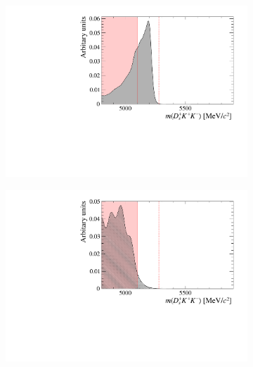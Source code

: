 \begin{figure}[!h]
    \centering
    \begin{subfigure}[t]{0.49\textwidth}
        \includegraphics[width=1.0\textwidth]{figs/B2DsKK/Bs2Dsa1_4800_5900_Shape.pdf}
        \caption{\decay{\Bsb}{\Dsp\Km\Kstarz} }
        \label{fig:B2DsKK_part_reco_backgrounds_DsKKstar}
    \end{subfigure}
    \begin{subfigure}[t]{0.49\textwidth}
        \includegraphics[width=1.0\textwidth]{figs/B2DsKK/Bs2DsstKKst_4800_5900_Shape.pdf}
        \caption{\decay{\Bsb}{\Dssp\Km\Kstarz}}
        \label{fig:B2DsKK_part_reco_backgrounds_DssKKstar}
    \end{subfigure}
    \begin{subfigure}[t]{0.49\textwidth}

\end{subfigure}
\end{figure}
